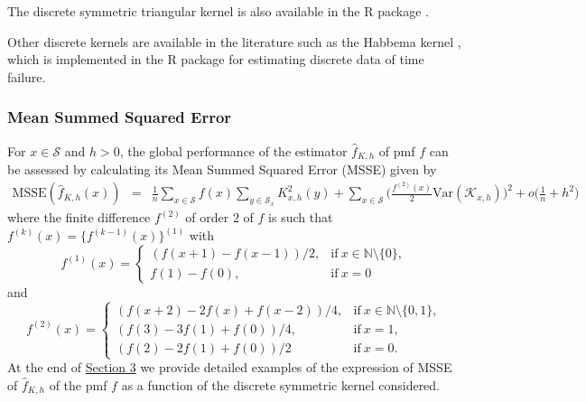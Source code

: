 The discrete symmetric triangular kernel is also available in the  R package \citep{Wansouwe2016}.

Other discrete kernels are available in the literature such as the Habbema kernel \citep{Tutz1996}, which is implemented in the  R package \citep{Bagkavos2018} for estimating discrete data of time failure.

\subsubsection*{Mean Summed Squared Error}\label{mean-summed-squared-error}

For \(x\in \mathcal{S}\) and \(h>0\), the global performance of the estimator \(\widehat{f}_{K,h}\) of pmf \(f\) can be assessed by calculating its Mean Summed Squared Error (MSSE) given by
\begin{eqnarray}
 \text{MSSE}\left(\widehat{f}_{K,h}(x)\right)
 &=&\frac{1}{n}\sum_{x\in\mathcal{S}}f(x)\sum_{y\in\mathcal{S}_{x}}K^{2}_{x,h}(y) + \sum_{x\in\mathcal{S}}\bigg(\frac{f^{(2)}(x)}{2}\mathrm{Var}(\mathcal{K}_{x,h}) \bigg)^{2} + o\bigg(\frac{1}{n}+h^{2}\bigg)  \label{eq:mise}
 \end{eqnarray}
where the finite difference \(f^{(2)}\) of order \(2\) of \(f\) is such that \(f^{(k)}(x)=\{f^{(k-1)}(x)\}^{(1)}\) with
\begin{equation*}
 f^{(1)}(x)=\left\{   \begin{array}{cc}
      \left(f(x+1)-f(x-1)\right)/2,   & \mathrm{if \ } x\in\mathbb{N}\setminus\{0\},  \\
      f(1)- f(0),   & \mathrm{if \ } x=0 
    \end{array}
    \right.
\end{equation*}
and
\begin{equation*}
 f^{(2)}(x)=\left\{   
 \begin{array}{cc}
\left(f(x+2)-2f(x) + f(x-2)\right)/4,& \mathrm{if \ } x\in\mathbb{N}\setminus\{0, 1\},\\
\left(f(3) - 3f(1) + f(0)\right)/4,& \mathrm{if \ } x=1, \\
\left(f(2) - 2f(1) + f(0)\right)/2& \mathrm{if \ } x=0 .
    \end{array}
    \right.
\end{equation*}
At the end of \hyperref[sec3-optimal-kernel]{Section 3} we provide detailed examples of the expression of MSSE of \(\widehat{f}_{K,h}\) of the pmf \(f\) as a function of the discrete symmetric kernel considered.

